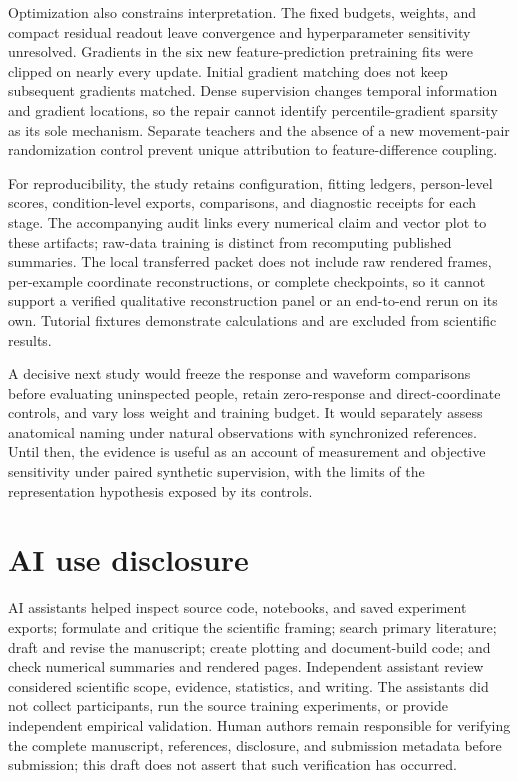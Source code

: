 \documentclass{article}
\begin{document}
Optimization also constrains interpretation. The fixed budgets, weights, and compact residual readout leave convergence and hyperparameter sensitivity unresolved. Gradients in the six new feature-prediction pretraining fits were clipped on nearly every update. Initial gradient matching does not keep subsequent gradients matched. Dense supervision changes temporal information and gradient locations, so the repair cannot identify percentile-gradient sparsity as its sole mechanism. Separate teachers and the absence of a new movement-pair randomization control prevent unique attribution to feature-difference coupling.

For reproducibility, the study retains configuration, fitting ledgers, person-level scores, condition-level exports, comparisons, and diagnostic receipts for each stage. The accompanying audit links every numerical claim and vector plot to these artifacts; raw-data training is distinct from recomputing published summaries. The local transferred packet does not include raw rendered frames, per-example coordinate reconstructions, or complete checkpoints, so it cannot support a verified qualitative reconstruction panel or an end-to-end rerun on its own. Tutorial fixtures demonstrate calculations and are excluded from scientific results.

A decisive next study would freeze the response and waveform comparisons before evaluating uninspected people, retain zero-response and direct-coordinate controls, and vary loss weight and training budget. It would separately assess anatomical naming under natural observations with synchronized references. Until then, the evidence is useful as an account of measurement and objective sensitivity under paired synthetic supervision, with the limits of the representation hypothesis exposed by its controls.

\clearpage
\section*{AI use disclosure}
AI assistants helped inspect source code, notebooks, and saved experiment exports; formulate and critique the scientific framing; search primary literature; draft and revise the manuscript; create plotting and document-build code; and check numerical summaries and rendered pages. Independent assistant review considered scientific scope, evidence, statistics, and writing. The assistants did not collect participants, run the source training experiments, or provide independent empirical validation. Human authors remain responsible for verifying the complete manuscript, references, disclosure, and submission metadata before submission; this draft does not assert that such verification has occurred.


\end{document}
